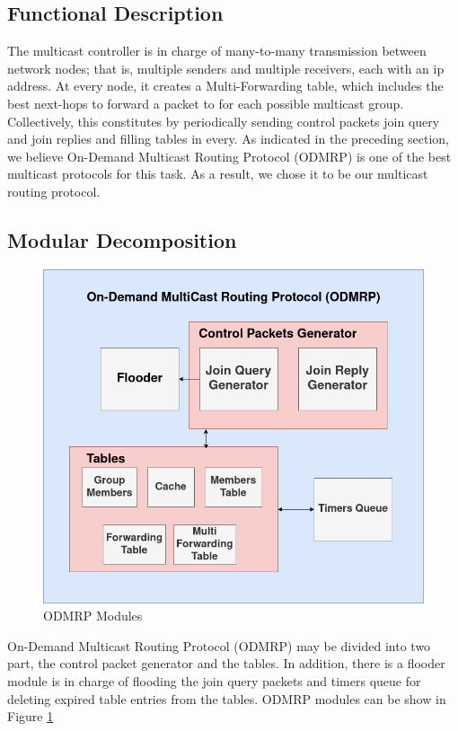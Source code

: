 \subsection{Functional Description}
The multicast controller is in charge of many-to-many transmission between network nodes; that is, multiple senders and multiple receivers, each with an \acrshort{ip} address. At every node, it creates a Multi-Forwarding table, which includes the best next-hops to forward a packet to for each possible multicast group. Collectively, this constitutes by periodically sending control packets join query and join replies and filling tables in every. As indicated in the preceding section, we believe On-Demand Multicast Routing Protocol (ODMRP) is one of the best multicast protocols for this task. As a result, we chose it to be our multicast routing protocol.

\subsection{Modular Decomposition}

\begin{figure}[!htbp]
    \centering
    \includegraphics[width=\linewidth]{images/odmrp-modules.png}
    \caption{ODMRP Modules}
    \label{fig:odmrp-modules}
\end{figure}

On-Demand Multicast Routing Protocol (ODMRP) may be divided into two part, the control packet generator and the tables. In addition, there is a flooder module is in charge of flooding the join query packets and timers queue for deleting expired table entries from the tables. ODMRP modules can be show in Figure  \ref{fig:odmrp-modules}
\\
